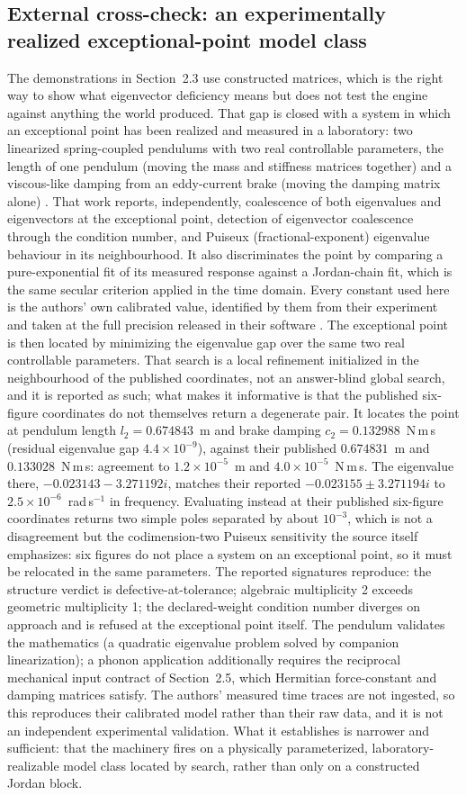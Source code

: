 \subsection{External cross-check: an experimentally realized exceptional-point model class}

The demonstrations in Section~2.3 use constructed matrices, which is the right way to show what eigenvector deficiency means but does not test the engine against anything the world produced. That gap is closed with a system in which an exceptional point has been realized and measured in a laboratory: two linearized spring-coupled pendulums with two real controllable parameters, the length of one pendulum (moving the mass and stiffness matrices together) and a viscous-like damping from an eddy-current brake (moving the damping matrix alone) \citep{even2024}. That work reports, independently, coalescence of both eigenvalues and eigenvectors at the exceptional point, detection of eigenvector coalescence through the condition number, and Puiseux (fractional-exponent) eigenvalue behaviour in its neighbourhood. It also discriminates the point by comparing a pure-exponential fit of its measured response against a Jordan-chain fit, which is the same secular criterion applied in the time domain. Every constant used here is the authors' own calibrated value, identified by them from their experiment and taken at the full precision released in their software \citep{evencode}. The exceptional point is then located by minimizing the eigenvalue gap over the same two real controllable parameters. That search is a local refinement initialized in the neighbourhood of the published coordinates, not an answer-blind global search, and it is reported as such; what makes it informative is that the published six-figure coordinates do not themselves return a degenerate pair. It locates the point at pendulum length \(l_2 = 0.674843\)~m and brake damping \(c_2 = 0.132988\)~N\,m\,s (residual eigenvalue gap \(4.4\times10^{-9}\)), against their published \(0.674831\)~m and \(0.133028\)~N\,m\,s: agreement to \(1.2\times10^{-5}\)~m and \(4.0\times10^{-5}\)~N\,m\,s. The eigenvalue there, \(-0.023143 - 3.271192i\), matches their reported \(-0.023155 \pm 3.271194i\) to \(2.5\times10^{-6}\)~rad\,s\(^{-1}\) in frequency. Evaluating instead at their published six-figure coordinates returns two simple poles separated by about \(10^{-3}\), which is not a disagreement but the codimension-two Puiseux sensitivity the source itself emphasizes: six figures do not place a system on an exceptional point, so it must be relocated in the same parameters. The reported signatures reproduce: the structure verdict is defective-at-tolerance; algebraic multiplicity 2 exceeds geometric multiplicity 1; the declared-weight condition number diverges on approach and is refused at the exceptional point itself. The pendulum validates the mathematics (a quadratic eigenvalue problem solved by companion linearization); a phonon application additionally requires the reciprocal mechanical input contract of Section~2.5, which Hermitian force-constant and damping matrices satisfy. The authors' measured time traces are not ingested, so this reproduces their calibrated model rather than their raw data, and it is not an independent experimental validation. What it establishes is narrower and sufficient: that the machinery fires on a physically parameterized, laboratory-realizable model class located by search, rather than only on a constructed Jordan block.
